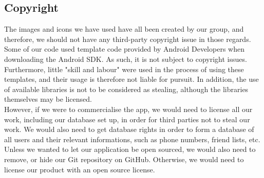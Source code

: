 \documentclass[a4paper,11pt]{article}
\begin{document}
\subsection*{Copyright}
The images and icons we have used have all been created by our group, and therefore, we should not have any third-party copyright issue in those regards.
Some of our code used template code provided by Android Developers when downloading the Android SDK. As such, it is not subject to copyright issues. Furthermore, little "skill and labour" were used in the process of using these templates, and their usage is therefore not liable for pursuit. In addition, the use of available libraries is not to be considered as stealing, although the libraries themselves may be licensed.\\
However, if we were to commercialise the app, we would need to license all our work, including our database set up, in order for third parties not to steal our work. We would also need to get database rights in order to form a database of all users and their relevant informations, such as phone numbers, friend lists, etc. \\
Unless we wanted to let our application be open sourced, we would also need to remove, or hide our Git repository on GitHub. Otherwise, we would need to license our product with an open source license.
\end{document}
